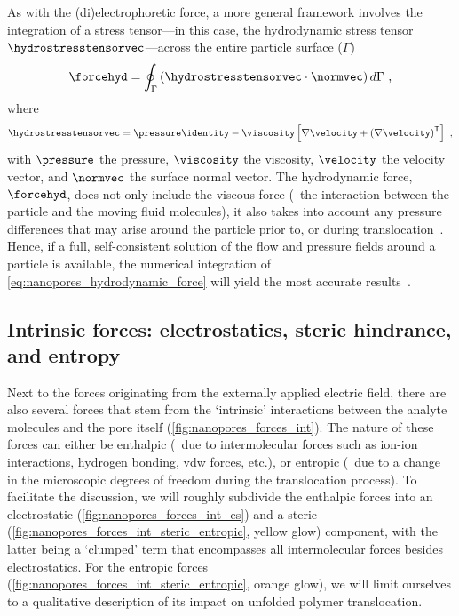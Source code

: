 As with the (di)electrophoretic force, a more general framework involves the integration of a stress
tensor---in this case, the hydrodynamic stress tensor $\hydrostresstensorvec$---across the entire particle
surface ($\Gamma$)~\cite{Ghosal-2019}
%
\begin{equation}\label{eq:nanopores_hydrodynamic_force}
  \forcehyd = \oint_{\Gamma} \left( \hydrostresstensorvec \cdot \normvec \right) d\Gamma
  \text{ ,}
\end{equation}
%
where
%
\begin{align}\label{eq:nanopores_hydrodynamic_stresstensor}
  \hydrostresstensorvec =
  \pressure\identity - \viscosity\left[\nabla\velocity + \left(\nabla\velocity \right)^\mathsf{T}\right]
  \text{ ,}
\end{align}
%
with $\pressure$ the pressure, $\viscosity$ the viscosity, $\velocity$ the velocity vector, and $\normvec$ the
surface normal vector. The hydrodynamic force, $\forcehyd$, does not only include the viscous force (\ie~the
interaction between the particle and the moving fluid molecules), it also takes into account any pressure
differences that may arise around the particle prior to, or during
translocation~\cite{Hoogerheide-2014,Wilson-2018}. Hence, if a full, self-consistent solution of the flow and
pressure fields around a particle is available, the numerical integration of
\cref{eq:nanopores_hydrodynamic_force} will yield the most accurate results~\cite{Galla-2014}.



\subsection{Intrinsic forces: electrostatics, steric hindrance, and entropy}
%

Next to the forces originating from the externally applied electric field, there are also several forces that
stem from the `intrinsic' interactions between the analyte molecules and the pore itself
(\cref{fig:nanopores_forces_int}). The nature of these forces can either be enthalpic (\ie~due to
intermolecular forces such as ion-ion interactions, hydrogen bonding, \gls{vdw} forces, etc.), or entropic
(\ie~due to a change in the microscopic degrees of freedom during the translocation process). To facilitate
the discussion, we will roughly subdivide the enthalpic forces into an electrostatic
(\cref{fig:nanopores_forces_int_es}) and a steric (\cref{fig:nanopores_forces_int_steric_entropic}, yellow
glow) component, with the latter being a `clumped' term that encompasses all intermolecular forces besides
electrostatics. For the entropic forces (\cref{fig:nanopores_forces_int_steric_entropic}, orange glow), we
will limit ourselves to a qualitative description of its impact on unfolded polymer translocation.


